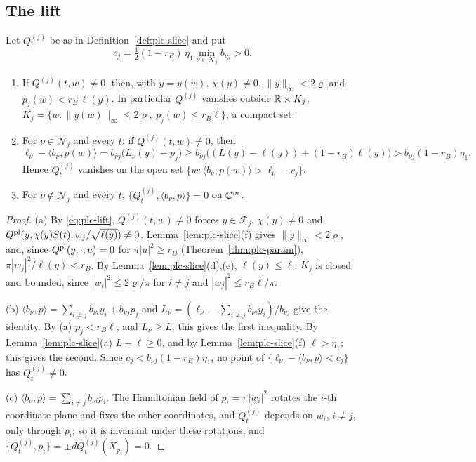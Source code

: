 \subsection{The lift}\label{sec:plc-lift}

\begin{lemma}\label{lem:plc-faces}
Let $Q^{(j)}$ be as in Definition~\ref{def:plc-slice} and put
\[
 c_j=\tfrac12(1-r_B)\,\eta_1\min_{\nu\in\mathcal N_j}b_{\nu j}>0.
\]
\begin{enumerate}[label=(\alph*)]
\item If $Q^{(j)}(t,w)\ne0$, then, with $y=y(w)$, $\chi(y)\ne0$, $\|y\|_\infty<2\varrho$ and $p_j(w)<r_B\,\ell(y)$. In particular
 $Q^{(j)}$ vanishes outside $\mathbb{R}\times K_j$, $K_j=\{w:\|y(w)\|_\infty\le2\varrho,\ p_j(w)\le r_B\bar\ell\}$, a compact set.
\item For $\nu\in\mathcal N_j$ and every $t$: if $Q^{(j)}(t,w)\ne0$, then
 \begin{equation}\label{eq:plc-collar}
  \ell_\nu-\langle b_\nu,p(w)\rangle=b_{\nu j}\bigl(L_\nu(y)-p_j\bigr)\ge b_{\nu j}\bigl((L(y)-\ell(y))+(1-r_B)\ell(y)\bigr)
  >b_{\nu j}(1-r_B)\eta_1 .
 \end{equation}
 Hence $Q^{(j)}_t$ vanishes on the open set $\{w:\langle b_\nu,p(w)\rangle>\ell_\nu-c_j\}$.
\item For $\nu\notin\mathcal N_j$ and every $t$, $\{Q^{(j)}_t,\langle b_\nu,p\rangle\}=0$ on $\mathbb{C}^m$.
\end{enumerate}
\end{lemma}

\begin{proof}
(a) By \eqref{eq:plc-lift}, $Q^{(j)}(t,w)\ne0$ forces $y\in\mathcal F_j$, $\chi(y)\ne0$ and
$Q^{\rm pl}(y,\chi(y)S(t),w_j/\sqrt{\ell(y)})\ne0$. Lemma~\ref{lem:plc-slice}(f) gives $\|y\|_\infty<2\varrho$, and, since
$Q^{\rm pl}(y,\cdot,u)=0$ for $\pi|u|^2\ge r_B$ (Theorem~\ref{thm:plc-param}), $\pi|w_j|^2/\ell(y)<r_B$. By
Lemma~\ref{lem:plc-slice}(d),(e), $\ell(y)\le\bar\ell$. $K_j$ is closed and bounded, since $|w_i|^2\le2\varrho/\pi$ for $i\ne j$ and
$|w_j|^2\le r_B\bar\ell/\pi$.

(b) $\langle b_\nu,p\rangle=\sum_{i\ne j}b_{\nu i}y_i+b_{\nu j}p_j$ and $L_\nu=(\ell_\nu-\sum_{i\ne j}b_{\nu i}y_i)/b_{\nu j}$ give the identity. By (a)
$p_j<r_B\ell$, and $L_\nu\ge L$; this gives the first inequality. By Lemma~\ref{lem:plc-slice}(a) $L-\ell\ge0$, and by
Lemma~\ref{lem:plc-slice}(f) $\ell>\eta_1$; this gives the second. Since $c_j<b_{\nu j}(1-r_B)\eta_1$, no point of
$\{\ell_\nu-\langle b_\nu,p\rangle<c_j\}$ has $Q^{(j)}_t\ne0$.

(c) $\langle b_\nu,p\rangle=\sum_{i\ne j}b_{\nu i}p_i$. The Hamiltonian field of $p_i=\pi|w_i|^2$ rotates the $i$-th coordinate plane and
fixes the other coordinates, and $Q^{(j)}_t$ depends on $w_i$, $i\ne j$, only through $p_i$; so it is invariant under these
rotations, and $\{Q^{(j)}_t,p_i\}=\pm dQ^{(j)}_t(X_{p_i})=0$.
\end{proof}

